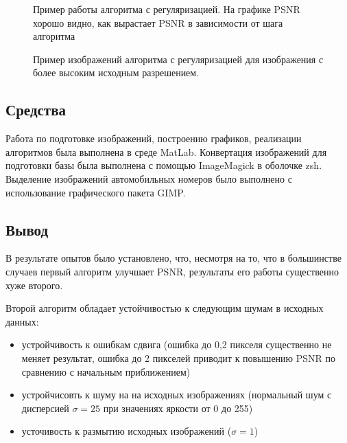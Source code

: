 \begin{figure}[p]
  \centering
  
  \caption{Пример работы алгоритма с регуляризацией. На графике PSNR хорошо видно, как вырастает PSNR в зависимости
    от шага алгоритма \label{plot_sr2_rising_low}}
\end{figure}

 \begin{figure}[p]
   \centering
   
   \caption{Пример изображений алгоритма с регуляризацией для изображения с более высоким исходным разрешением.
     \label{plot_sr2_rising_high}}
 \end{figure}


\subsection{Средства}
Работа по подготовке изображений, построению графиков, реализации алгоритмов была выполнена в среде MatLab. Конвертация
изображений для подготовки базы была выполнена с помощью ImageMagick в оболочке zsh. Выделение изображений автомобильных
номеров было выполнено с использование графического пакета GIMP.



\subsection{Вывод} В результате опытов было установлено, что, несмотря на то, что в большинстве случаев первый алгоритм
улучшает PSNR, результаты его работы существенно хуже второго.

Второй алгоритм обладает устойчивостью к следующим шумам в исходных данных:
\begin{itemize}
  \item устройчивость к ошибкам сдвига (ошибка до 0,2 пикселя существенно не меняет результат, ошибка до 2 пикселей
    приводит к повышению PSNR по сравнению с начальным приближением)
  \item устройчисовть к шуму на на исходных изображениях (нормальный шум с дисперсией $\sigma=25$ при значениях яркости
    от 0 до 255)
  \item усточивость к размытию исходных изображений ($\sigma = 1$)
\end{itemize}

